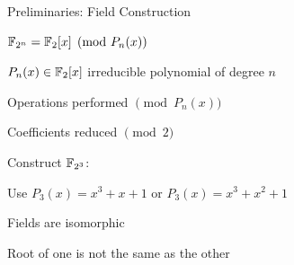 \begin{frame}{\large Preliminaries: Field Construction}
\bi
	\item ${\mathbb{F}}_{2^n} = {\mathbb{F}}_2[x]\pmod{P_n(x)}$ 
	\bi
		\item $P_n(x) \in {\mathbb{F}}_2[x]$ irreducible polynomial of degree $n$
		\pause
		\item Operations performed $\pmod{P_n(x)}$ 
		\item Coefficients reduced $\pmod{2}$
	\ei
	\pause
	\vspace{0.1in}
	\vspace{0.1in}
	\item Construct ${\mathbb{F}}_{2^3}$: 
	\bi
		\item Use $P_3(x) = x^3+x+1$ or $P_3(x) = x^3+x^2+1$
		\pause
		\bi
		\item Fields are isomorphic
		\pause
		\item Root of one is not the same as the other
		\ei
	\ei
\ei
\end{frame}



